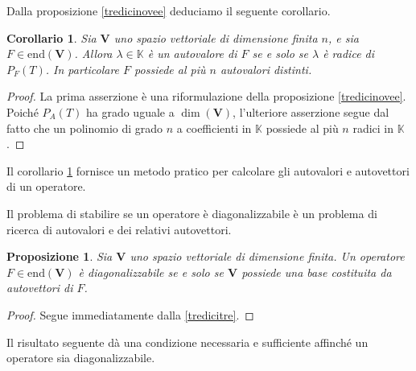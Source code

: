 \documentclass{article}
\theoremstyle{plain}
\newtheorem{prop}[thm]{Proposizione}
\newtheorem{cor}{Corollario}
\theoremstyle{definition}
\theoremstyle{remark}
\begin{document}
\vspace{10pt}

Dalla proposizione \ref{tredicinovee} deduciamo il seguente corollario.

\vspace{10pt}

\begin{bxthm}
\begin{cor}\label{trediciundici}
    Sia $\mathbf{V}$ uno spazio vettoriale di dimensione finita $n$, e sia $F \in \mathrm{end}(\mathbf{V})$. 
    Allora $\lambda \in \mathbb{K}$ è un autovalore di $F$ se e solo se $\lambda$ è radice di $P_F(T)$. 
    In particolare $F$ possiede al più $n$ autovalori distinti.    
\end{cor}    
\end{bxthm}
\begin{proof}
La prima asserzione è una riformulazione della proposizione \ref{tredicinovee}. 
Poiché $P_A(T)$ ha grado uguale a $\dim(\mathbf{V})$, l'ulteriore asserzione segue dal fatto che un polinomio di 
grado $n$ a coefficienti in $\mathbb{K}$ possiede al più $n$ radici in $\mathbb{K}$.    
\end{proof}

\vspace{10pt}

Il corollario \ref{trediciundici} fornisce un metodo pratico per calcolare gli autovalori e autovettori di un operatore. 

\vspace{10pt}

Il problema di stabilire se un operatore è diagonalizzabile è un problema di ricerca di autovalori e dei relativi autovettori. 

\vspace{10pt}

\begin{bxthm}
\begin{prop}\label{tredicidodici}
Sia $\mathbf{V}$ uno spazio vettoriale di dimensione finita. Un operatore $F \in \mathrm{end}(\mathbf{V})$ 
è diagonalizzabile se e solo se $\mathbf{V}$ possiede una base costituita da autovettori di $F$.
\end{prop}
\end{bxthm}
\begin{proof}
    Segue immediatamente dalla \ref{tredicitre}.
\end{proof}

\vspace{10pt}

Il risultato seguente dà una condizione necessaria e sufficiente affinché un operatore sia diagonalizzabile.
\end{document}
